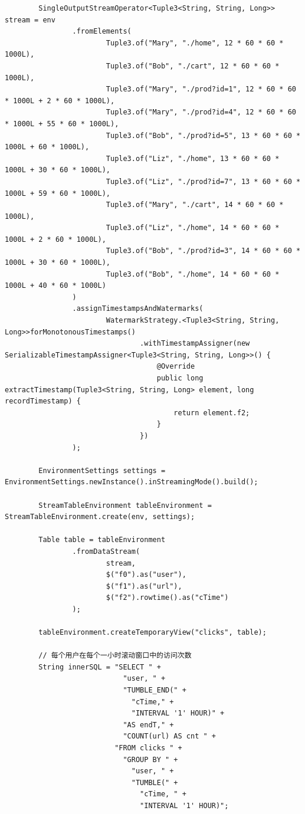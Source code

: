 \documentclass[cn,11pt,chinese]{elegantbook}
\begin{document}
\begin{verbatim}
        SingleOutputStreamOperator<Tuple3<String, String, Long>> stream = env
                .fromElements(
                        Tuple3.of("Mary", "./home", 12 * 60 * 60 * 1000L),
                        Tuple3.of("Bob", "./cart", 12 * 60 * 60 * 1000L),
                        Tuple3.of("Mary", "./prod?id=1", 12 * 60 * 60 * 1000L + 2 * 60 * 1000L),
                        Tuple3.of("Mary", "./prod?id=4", 12 * 60 * 60 * 1000L + 55 * 60 * 1000L),
                        Tuple3.of("Bob", "./prod?id=5", 13 * 60 * 60 * 1000L + 60 * 1000L),
                        Tuple3.of("Liz", "./home", 13 * 60 * 60 * 1000L + 30 * 60 * 1000L),
                        Tuple3.of("Liz", "./prod?id=7", 13 * 60 * 60 * 1000L + 59 * 60 * 1000L),
                        Tuple3.of("Mary", "./cart", 14 * 60 * 60 * 1000L),
                        Tuple3.of("Liz", "./home", 14 * 60 * 60 * 1000L + 2 * 60 * 1000L),
                        Tuple3.of("Bob", "./prod?id=3", 14 * 60 * 60 * 1000L + 30 * 60 * 1000L),
                        Tuple3.of("Bob", "./home", 14 * 60 * 60 * 1000L + 40 * 60 * 1000L)
                )
                .assignTimestampsAndWatermarks(
                        WatermarkStrategy.<Tuple3<String, String, Long>>forMonotonousTimestamps()
                                .withTimestampAssigner(new SerializableTimestampAssigner<Tuple3<String, String, Long>>() {
                                    @Override
                                    public long extractTimestamp(Tuple3<String, String, Long> element, long recordTimestamp) {
                                        return element.f2;
                                    }
                                })
                );

        EnvironmentSettings settings = EnvironmentSettings.newInstance().inStreamingMode().build();

        StreamTableEnvironment tableEnvironment = StreamTableEnvironment.create(env, settings);

        Table table = tableEnvironment
                .fromDataStream(
                        stream,
                        $("f0").as("user"),
                        $("f1").as("url"),
                        $("f2").rowtime().as("cTime")
                );

        tableEnvironment.createTemporaryView("clicks", table);

        // 每个用户在每个一小时滚动窗口中的访问次数
        String innerSQL = "SELECT " +
                            "user, " +
                            "TUMBLE_END(" +
                              "cTime," +
                              "INTERVAL '1' HOUR)" +
                            "AS endT," +
                            "COUNT(url) AS cnt " +
                          "FROM clicks " +
                            "GROUP BY " +
                              "user, " +
                              "TUMBLE(" +
                                "cTime, " +
                                "INTERVAL '1' HOUR)";


\end{verbatim}
\end{document}
